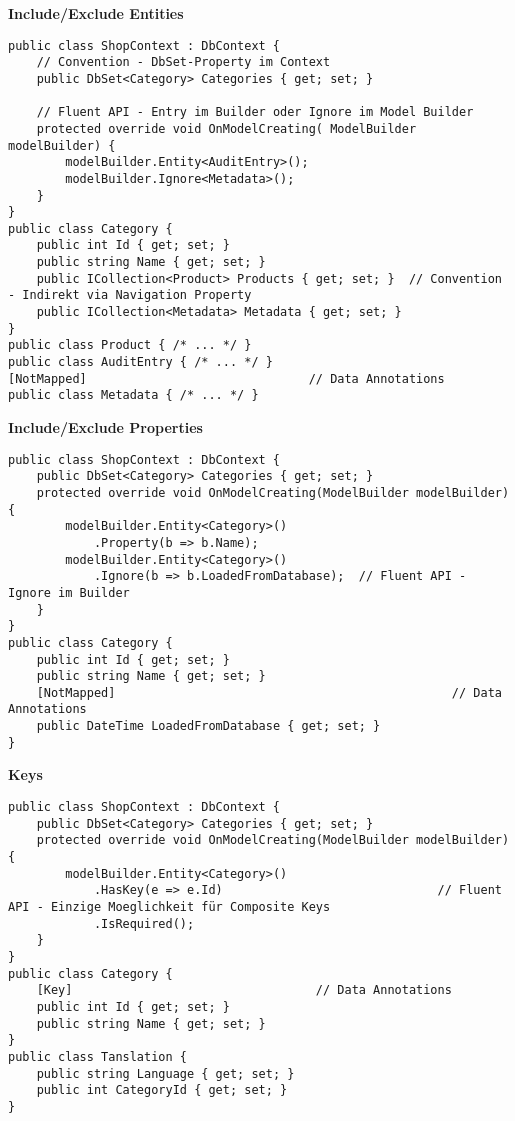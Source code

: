 \textbf{Include/Exclude Entities}
\begin{lstlisting}
public class ShopContext : DbContext {
    // Convention - DbSet-Property im Context
    public DbSet<Category> Categories { get; set; }
    
    // Fluent API - Entry im Builder oder Ignore im Model Builder
    protected override void OnModelCreating( ModelBuilder modelBuilder) {
        modelBuilder.Entity<AuditEntry>();          
        modelBuilder.Ignore<Metadata>();
    }
}
public class Category {
    public int Id { get; set; }
    public string Name { get; set; }
    public ICollection<Product> Products { get; set; }  // Convention - Indirekt via Navigation Property
    public ICollection<Metadata> Metadata { get; set; }
}
public class Product { /* ... */ }
public class AuditEntry { /* ... */ }
[NotMapped]                               // Data Annotations
public class Metadata { /* ... */ }
\end{lstlisting}

\textbf{Include/Exclude Properties}
\begin{lstlisting}
public class ShopContext : DbContext {
    public DbSet<Category> Categories { get; set; }
    protected override void OnModelCreating(ModelBuilder modelBuilder) {
        modelBuilder.Entity<Category>()
            .Property(b => b.Name);                     
        modelBuilder.Entity<Category>()
            .Ignore(b => b.LoadedFromDatabase);  // Fluent API - Ignore im Builder
    }
}
public class Category {
    public int Id { get; set; }
    public string Name { get; set; }
    [NotMapped]                                               // Data Annotations
    public DateTime LoadedFromDatabase { get; set; }
}
\end{lstlisting}

\textbf{Keys}
\begin{lstlisting}
public class ShopContext : DbContext {
    public DbSet<Category> Categories { get; set; }
    protected override void OnModelCreating(ModelBuilder modelBuilder) {
        modelBuilder.Entity<Category>()
            .HasKey(e => e.Id)                              // Fluent API - Einzige Moeglichkeit für Composite Keys
            .IsRequired();
    }
}
public class Category {
    [Key]                                  // Data Annotations
    public int Id { get; set; }
    public string Name { get; set; }
}
public class Tanslation {
    public string Language { get; set; }
    public int CategoryId { get; set; }
}
\end{lstlisting}


